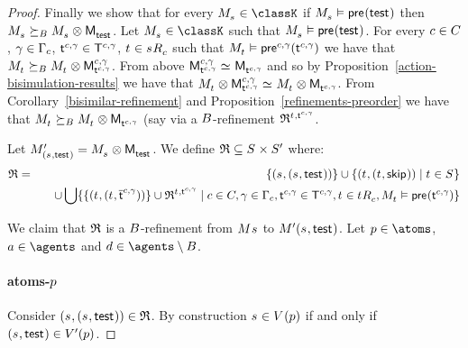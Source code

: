\begin{proof}
Finally we show that for every $\kPModel{\kStateS} \in \classK$ if $\kPModel{\kStateS} \entails \aPrecondition(\aStateTest)$ then $\kPModel{\kStateS} \simulatesBs \kPModel{\kStateS} \exec \aPModel{\aStateTest}$.
Let $\kPModel{\kStateS} \in \classK$ such that $\kPModel{\kStateS} \entails \aPrecondition(\aStateTest)$.
For every $\agentC \in \agentsC$, $\gamma \in \Gamma_\agentC$, $\aStateT[\agentC, \gamma] \in \aStatesT[\agentC, \gamma]$, $\kStateT \in \kSuccessorsC{\kStateS}$ such that $\kPModel{\kStateT} \entails \aPrecondition[\agentC,\gamma](\aStateT[\agentC,\gamma])$ we have that $\kPModel{\kStateT} \simulatesBs \kPModel{\kStateT} \exec \aPModel[\agentC, \gamma]{\aStateT[\agentC, \gamma]}$.
From above $\aPModel[\agentC, \gamma]{\aStateT[\agentC, \gamma]} \bisimilar \aPModel{\aStateT[\agentC, \gamma]}$ and so by 
Proposition~\ref{action-bisimulation-results} we have that $\kPModel{\kStateT} \exec \aPModel[\agentC, \gamma]{\aStateT[\agentC, \gamma]} \bisimilar \kPModel{\kStateT} \exec \aPModel{\aStateT[\agentC, \gamma]}$.
From Corollary~\ref{bisimilar-refinement} and Proposition~\ref{refinements-preorder} we have that $\kPModel{\kStateT} \simulatesBs \kPModel{\kStateT} \exec \aPModel{\aStateT[\agentC, \gamma]}$ (say via a $\agentsB$-refinement $\refinement^{\kStateT, \aStateT[\agentC, \gamma]}$.

Let $\kPModelP{(\kStateS, \aStateTest)} = \kPModel{\kStateS} \exec \aPModel{\aStateTest}$.
We define $\refinement \subseteq \kStates \times \kStatesP$ where:
\begin{eqnarray*}
\refinement &=& 
\{(\kStateS, (\kStateS, \aStateTest))\} \cup 
\{(\kStateT, (\kStateT, \aStateSkip)) \mid \kStateT \in \kStates\}  \\&&\quad \cup
\bigcup \{\{(\kStateT, (\kStateT, \aPStateT[\agentC, \gamma]))\} \cup \refinement^{\kStateT, \aStateT[\agentC, \gamma]} \mid \agentC \in \agentsC, \gamma \in \Gamma_\agentC, \aStateT[\agentC, \gamma] \in \aStatesT[\agentC, \gamma], \kStateT \in \kSuccessorsC{\kStateT}, \kPModel{\kStateT} \entails \aPrecondition(\aStateT[\agentC, \gamma])\}
\end{eqnarray*}

We claim that $\refinement$ is a $\agentsB$-refinement from $\kModel{\kStateS}$ to $\kModelP{(\kStateS, \aStateTest)}$.
Let $\atomP \in \atoms$, $\agentA \in \agents$ and $\agentD \in \agents \setminus \agentsB$.

\paragraph{atoms-$\atomP$}
Consider $(\kStateS, (\kStateS, \aStateTest)) \in \refinement$.
By construction $\kStateS \in \kValuation(\atomP)$ if and only if $(\kStateS, \aStateTest) \in \kValuationP(\atomP)$.


\end{proof}
